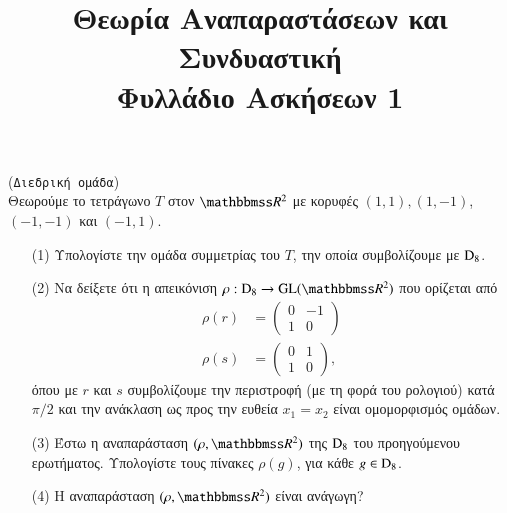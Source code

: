 \documentclass[12pt,a4paper,reqno]{amsart}
\title[]{Θεωρία Αναπαραστάσεων και Συνδυαστική \\ Φυλλάδιο Ασκήσεων 1}
\begin{document}
\begingroup
\def\uppercasenonmath#1{} %
\let\MakeUppercase\relax %
\maketitle
\endgroup

\setcounter{section}{1}
\thispagestyle{empty}

\begin{exercise}{(\texttt{Διεδρική ομάδα})}
    \\
    Θεωρούμε το τετράγωνο $T$ στον $\RR^2$ με κορυφές $(1,1), (1,-1)$, $(-1,-1)$ και $(-1,1)$.
    \begin{itemize}
        \item[(1)] Υπολογίστε την ομάδα συμμετρίας του $T$, την οποία συμβολίζουμε με $\mathrm{D}_8$.
        \item[(2)] Να δείξετε ότι η απεικόνιση $\rho : \rmD_8 \to \GL(\RR^2)$ που ορίζεται από 
        \begin{align*}
            \rho(r) &= 
                \begin{pmatrix}
                    0 & -1 \\
                    1 & 0
                \end{pmatrix} \\
            \rho(s) &= 
                \begin{pmatrix}
                    0 & 1 \\
                    1 & 0
                \end{pmatrix},
        \end{align*}
        όπου με $r$ και $s$ συμβολίζουμε την περιστροφή (με τη φορά του ρολογιού) κατά $\pi/2$ και την ανάκλαση ως προς την ευθεία $x_1 = x_2$ είναι ομομορφισμός ομάδων. 
        \item[(3)] Έστω η αναπαράσταση $(\rho, \RR^2)$ της $\mathrm{D}_8$ του προηγούμενου ερωτήματος. Υπολογίστε τους πίνακες $\rho(g)$, για κάθε $g \in \mathrm{D}_8$.
        \item[(4)] Η αναπαράσταση $(\rho, \RR^2)$ είναι ανάγωγη?
    \end{itemize}
\end{exercise}
\end{document}
